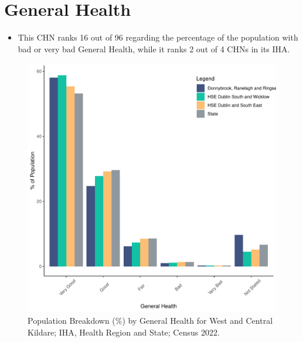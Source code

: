 \documentclass{article}
\begin{document}
\pagebreak

\section{General Health}\label{sect:GenHealth}
\begin{itemize}
\item  This CHN ranks  16 out of 96 regarding the percentage of the population with bad or very bad General Health, while it ranks   2 out of 4 CHNs in its IHA.
\end{itemize}
\begin{figure}[h]
	\centering
	\includegraphics[width = 150mm]{../figures/GenED.pdf}
	\caption{Population Breakdown (\%) by General Health for West and Central Kildare; IHA, Health Region and State;  Census 2022.}
	\label{fig:2ae19629-1a6a-13a3-e055-000000000001}
	\end{figure}
\end{document}
